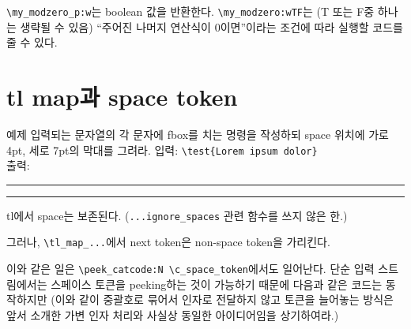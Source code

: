 \documentclass[a4paper,amsmath]{oblivoir}
\begin{document}
\verb|\my_modzero_p:w|는 boolean 값을 반환한다. \verb|\my_modzero:wTF|는 (T 또는 F중 하나는 생략될 수 있음) “주어진 나머지 연산식이 0이면”이라는 조건에 따라 실행할 코드를 줄 수 있다.


\section{tl map과 space token}

\begin{questiona}{예제}
입력되는 문자열의 각 문자에 fbox를 치는 명령을 작성하되 space 위치에 가로 4pt, 세로 7pt의 
막대를 그려라.
\tcblower
입력: \verb|\test{Lorem ipsum dolor}|\\
출력: \rule{4pt}{7pt}%
\rule{4pt}{7pt}%
\end{questiona}

tl에서 space는 보존된다. (\verb|...ignore_spaces| 관련 함수를 쓰지 않은 한.)

그러나, \verb|\tl_map_...|에서 next token은 non-space token을 가리킨다.

이와 같은 일은 \verb|\peek_catcode:N \c_space_token|에서도 일어난다.
단순 입력 스트림에서는 스페이스 토큰을 peeking하는 것이 가능하기 때문에 다음과 같은 코드는 동작하지만 
(이와 같이 중괄호로 묶어서 인자로 전달하지 않고 토큰을 늘어놓는 방식은 앞서 소개한 
가변 인자 처리와 사실상 동일한 아이디어임을 상기하여라.)
\end{document}
